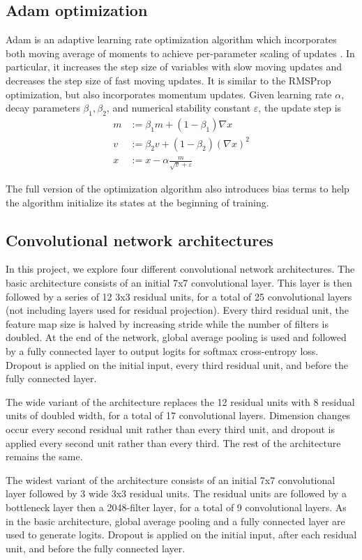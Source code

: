 \documentclass[10pt,twocolumn,letterpaper]{article}
\begin{document}
\subsection{Adam optimization}
Adam is an adaptive learning rate optimization algorithm which incorporates both moving average of moments to achieve per-parameter scaling of updates \cite{kingma2014adam}. In particular, it increases the step size of variables with slow moving updates and decreases the step size of fast moving updates. It is similar to the RMSProp optimization, but also incorporates momentum updates. Given learning rate $\alpha$, decay parameters $\beta_1, \beta_2$, and numerical stability constant $\varepsilon$, the update step is
\begin{align}
m &:= \beta_1 m + (1 - \beta_1) \nabla x \\
v &:= \beta_2 v + (1 - \beta_2) (\nabla x)^2 \\
x &:= x - \alpha \frac{m}{\sqrt{v} + \varepsilon}
\end{align}

The full version of the optimization algorithm also introduces bias terms to help the algorithm initialize its states at the beginning of training.

\subsection{Convolutional network architectures}
In this project, we explore four different convolutional network architectures. The basic architecture consists of an initial 7x7 convolutional layer. This layer is then followed by a series of 12 3x3 residual units, for a total of 25 convolutional layers (not including layers used for residual projection). Every third residual unit, the feature map size is halved by increasing stride while the number of filters is doubled. At the end of the network, global average pooling is used and followed by a fully connected layer to output logits for softmax cross-entropy loss. Dropout is applied on the initial input, every third residual unit, and before the fully connected layer.

The wide variant of the architecture replaces the 12 residual units with 8 residual units of doubled width, for a total of 17 convolutional layers. Dimension changes occur every second residual unit rather than every third unit, and dropout is applied every second unit rather than every third. The rest of the architecture remains the same.

The widest variant of the architecture consists of an initial 7x7 convolutional layer followed by 3 wide 3x3 residual units. The residual units are followed by a bottleneck layer then a 2048-filter layer, for a total of 9 convolutional layers. As in the basic architecture, global average pooling and a fully connected layer are used to generate logits. Dropout is applied on the initial input, after each residual unit, and before the fully connected layer.
\end{document}
